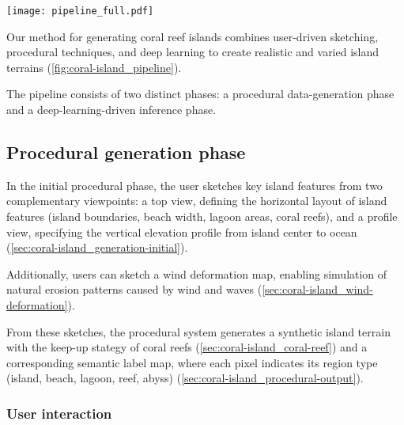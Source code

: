 \documentclass{egpubl}
\begin{document}
\begin{figure*}[t]
    \texttt{[image: pipeline\_full.pdf]}
    \caption{Our method is split in three interleaved stages: the generation process (\cref{sec:coral-island_example-generation}) which creates pairs of height fields and label maps of an island from sketches, the model training (\cref{sec:coral-island_cGAN-training}) which use a synthetic dataset from the previous stage to obtain a cGAN model that generates height fields from label maps to remove the constraints embedded in the initial generation process, and finally, the inference process (\cref{sec:coral-island_results}) uses the trained cGAN to generate the final height fields, including the coral generation process, automatically. }
    \label{fig:coral-island_pipeline}
\end{figure*}

Our method for generating coral reef islands combines user-driven sketching, procedural techniques, and deep learning to create realistic and varied island terrains (\cref{fig:coral-island_pipeline}). 

The pipeline consists of two distinct phases: a procedural data-generation phase and a deep-learning-driven inference phase. 

\subsection{Procedural generation phase}
\label{sec:coral-island_proc-phase}

In the initial procedural phase, the user sketches key island features from two complementary viewpoints: a top view, defining the horizontal layout of island features (island boundaries, beach width, lagoon areas, coral reefs), and a profile view, specifying the vertical elevation profile from island center to ocean (\cref{sec:coral-island_generation-initial}).

Additionally, users can sketch a wind deformation map, enabling simulation of natural erosion patterns caused by wind and waves (\cref{sec:coral-island_wind-deformation}).

From these sketches, the procedural system generates a synthetic island terrain with the keep-up stategy of coral reefs (\cref{sec:coral-island_coral-reef}) and a corresponding semantic label map, where each pixel indicates its region type (island, beach, lagoon, reef, abyss) (\cref{sec:coral-island_procedural-output}).




\subsubsection*{User interaction}
\label{sec:coral-island_description-UI}
\end{document}
